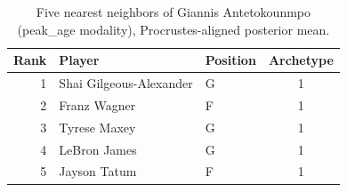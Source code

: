 \begin{table}[htbp]
  \centering\small
  \begin{tabular}{rllc}
    \toprule
    Rank & Player & Position & Archetype \\
    \midrule
    1 & Shai Gilgeous-Alexander & G & 1 \\
    2 & Franz Wagner & F & 1 \\
    3 & Tyrese Maxey & G & 1 \\
    4 & LeBron James & G & 1 \\
    5 & Jayson Tatum & F & 1 \\
    \bottomrule
  \end{tabular}
  \caption{Five nearest neighbors of Giannis Antetokounmpo (peak_age modality), Procrustes-aligned posterior mean.}
  \label{tab:Giannis_Antetokounmpo_neighbors_peak_age}
\end{table}

